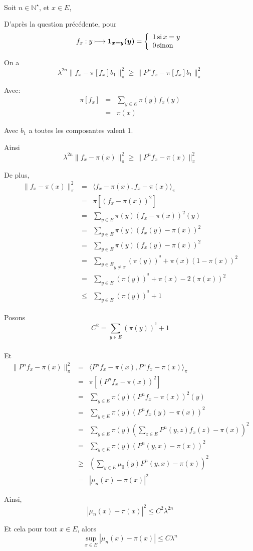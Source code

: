 \

Soit $n \in \mathbb{N}^{\star}$, et $x \in E$,

D'apr{\`e}s la question pr{\'e}c{\'e}dente, pour
\[ f_x : y \longmapsto \boldsymbol{1_{x = y} (y)} = \left\{\begin{array}{l}
     1 \operatorname{si} x = y\\
     0 \operatorname{sinon}
   \end{array}\right. \]


On a
\[ \lambda^{2 n} \| f_x - \pi [f_x] b_1 \|^2_{\pi} \geqslant \| P^n f_x - \pi
   [f_x] b_1 \|^2_{\pi} \]


Avec:
\begin{eqnarray*}
  \pi [f_x] & = & \sum_{y \in E} \pi (y) f_x (y)\\
  & = & \pi (x)
\end{eqnarray*}


Avec $b_1$ a toutes les composantes valent 1.

Ainsi
\[ \lambda^{2 n} \| f_x - \pi (x) \|^2_{\pi} \geqslant \| P^n f_x - \pi (x)
   \|^2_{\pi} \]


De plus,
\begin{eqnarray*}
  \| f_x - \pi (x) \|^2_{\pi} & = & \langle f_x - \pi (x), f_x - \pi (x)
  \rangle_{\pi}\\
  & = & \pi [(f_x - \pi (x) )^2]\\
  & = & \sum_{y \in E} \pi (y) (f_x - \pi (x))^2 (y)\\
  & = & \sum_{y \in E} \pi (y) (f_x (y) - \pi (x))^2\\
  & = & \sum_{y \in E} \pi (y) (f_x (y) - \pi (x))^2\\
  & = & \underset{y \neq x}{\sum_{y \in E}} (\pi (y))^{^3} + \pi (x) (1 - \pi
  (x))^2\\
  & = & \underset{}{\sum_{y \in E}} (\pi (y))^{^3} + \pi (x) - 2 (\pi
  (x))^2\\
  & \leqslant & \underset{}{\sum_{y \in E}} (\pi (y))^{^3} + 1
\end{eqnarray*}


Posons
\[ C^2 = \underset{}{\underset{y \in E}{\sum} } (\pi (y))^{^3} + 1 \]


Et
\begin{eqnarray*}
  \| P^n f_x - \pi (x) \|^2_{\pi} & = & \langle P^n f_x - \pi (x) , P^n f_x -
  \pi (x) \rangle_{\pi}\\
  & = & \pi [(P^n f_x - \pi (x))^2]\\
  & = & \sum_{y \in E} \pi (y) (P^n f_x - \pi (x))^2 (y)\\
  & = & \sum_{y \in E} \pi (y) (P^n f_x (y) - \pi (x))^2\\
  & = & \sum_{y \in E} \pi (y) \left( \sum_{z \in E} P^n (y, z) f_x (z) - \pi
  (x) \right)^2\\
  & = & \sum_{y \in E} \pi (y) (P^n (y, x) - \pi (x))^2\\
  & \geqslant & \left( \sum_{y \in E} \mu_0 (y) P^n (y, x) - \pi (x)
  \right)^2\\
  & = & | \mu_n (x) - \pi (x) |^2
\end{eqnarray*}


Ainsi,
\[ | \mu_n (x) - \pi (x) |^2 \leqslant C^2 \lambda^{2 n} \]


Et cela pour tout $x \in E$, alors
\[ \underset{x \in E}{\sup} | \mu_n (x) - \pi (x) | \leqslant C \lambda^n \]
